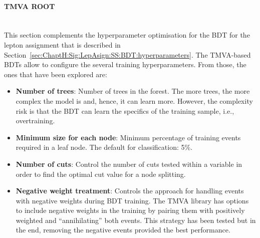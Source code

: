 \paragraph{TMVA ROOT}\mbox{}\\
This section complements the hyperparameter optimisation for the BDT for the lepton assignment
that is described in Section~\ref{sec:ChaptH:Sig:LepAsign:SS:BDT:hyperparameters}.
The TMVA-based BDTs allow to configure the several training hyperparameters.
From those, the ones that have been explored are:
\begin{itemize}
	\item \textbf{Number of trees}: Number of trees in the forest. The more trees, the more complex the 
		model is and, hence, it can learn more. However, the complexity risk is that the BDT can learn 
		the specifics of the training sample, i.e., overtraining.
		
			
	\item \textbf{Minimum size for each node}: Minimum percentage of training events required in a leaf node.
	 	The default for classification: 5\%. 
	
		
	\item \textbf{Number of cuts}: Control the number of cuts tested within 
		a variable in order to find the optimal cut value for a node splitting.
		
	\item \textbf{Negative weight treatment}: Controls the approach for handling 
		events with negative weights during BDT training. The TMVA library has options
		to include negative weights in the training by pairing them with positively weighted
		and ``annihilating'' both events. This strategy has been tested but in the end, removing the negative
		events provided the best performance. 

		
		

\end{itemize}
